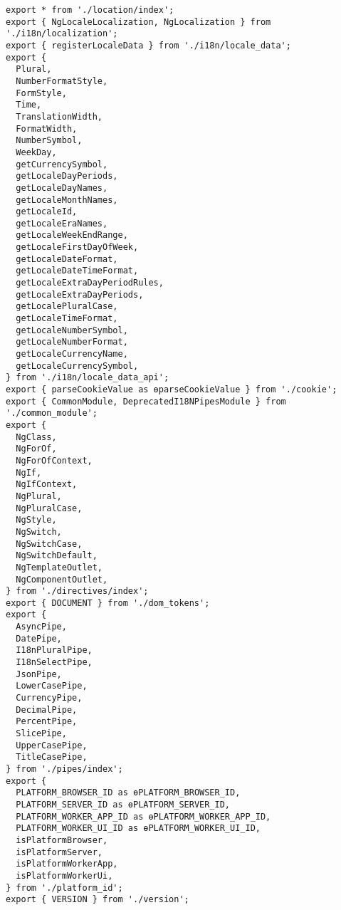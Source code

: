\begin{verbatim}
export * from './location/index';
export { NgLocaleLocalization, NgLocalization } from './i18n/localization';
export { registerLocaleData } from './i18n/locale_data';
export {
  Plural,
  NumberFormatStyle,
  FormStyle,
  Time,
  TranslationWidth,
  FormatWidth,
  NumberSymbol,
  WeekDay,
  getCurrencySymbol,
  getLocaleDayPeriods,
  getLocaleDayNames,
  getLocaleMonthNames,
  getLocaleId,
  getLocaleEraNames,
  getLocaleWeekEndRange,
  getLocaleFirstDayOfWeek,
  getLocaleDateFormat,
  getLocaleDateTimeFormat,
  getLocaleExtraDayPeriodRules,
  getLocaleExtraDayPeriods,
  getLocalePluralCase,
  getLocaleTimeFormat,
  getLocaleNumberSymbol,
  getLocaleNumberFormat,
  getLocaleCurrencyName,
  getLocaleCurrencySymbol,
} from './i18n/locale_data_api';
export { parseCookieValue as ɵparseCookieValue } from './cookie';
export { CommonModule, DeprecatedI18NPipesModule } from './common_module';
export {
  NgClass,
  NgForOf,
  NgForOfContext,
  NgIf,
  NgIfContext,
  NgPlural,
  NgPluralCase,
  NgStyle,
  NgSwitch,
  NgSwitchCase,
  NgSwitchDefault,
  NgTemplateOutlet,
  NgComponentOutlet,
} from './directives/index';
export { DOCUMENT } from './dom_tokens';
export {
  AsyncPipe,
  DatePipe,
  I18nPluralPipe,
  I18nSelectPipe,
  JsonPipe,
  LowerCasePipe,
  CurrencyPipe,
  DecimalPipe,
  PercentPipe,
  SlicePipe,
  UpperCasePipe,
  TitleCasePipe,
} from './pipes/index';
export {
  PLATFORM_BROWSER_ID as ɵPLATFORM_BROWSER_ID,
  PLATFORM_SERVER_ID as ɵPLATFORM_SERVER_ID,
  PLATFORM_WORKER_APP_ID as ɵPLATFORM_WORKER_APP_ID,
  PLATFORM_WORKER_UI_ID as ɵPLATFORM_WORKER_UI_ID,
  isPlatformBrowser,
  isPlatformServer,
  isPlatformWorkerApp,
  isPlatformWorkerUi,
} from './platform_id';
export { VERSION } from './version';
\end{verbatim}
